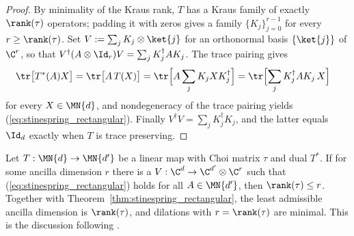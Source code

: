 \begin{proof}
    \leanok
    By minimality of the Kraus rank, $T$ has a Kraus family of exactly
    $\rank(\tau)$ operators; padding it with zeros gives a family
    $\{K_j\}_{j=0}^{r-1}$ for every $r\geq\rank(\tau)$. Set
    $V:=\sum_j K_j\otimes\ket{j}$ for an orthonormal basis $\{\ket{j}\}$ of
    $\C^{r}$, so that $V^\dagger(A\otimes\Id_r)V=\sum_j K_j^\dagger AK_j$. The
    trace pairing gives
    \begin{align}
        \tr\bigl[T^*(A)X\bigr]
        &=\tr\bigl[A\,T(X)\bigr]
          =\tr\Bigl[A\sum_j K_jXK_j^\dagger\Bigr]
          =\tr\Bigl[\sum_j K_j^\dagger AK_j\,X\Bigr]
        \label{eq:stinespring_rectangular_pairing}
    \end{align}
    for every $X\in\MN{d}$, and nondegeneracy of the trace pairing yields
    (\ref{eq:stinespring_rectangular}). Finally
    $V^\dagger V=\sum_j K_j^\dagger K_j$, and the latter equals $\Id_d$
    exactly when $T$ is trace preserving.
\end{proof}

\begin{lemma}\label{lem:stinespring_rectangular_least_dim}
    \leanok
    Let $T:\MN{d}\to\MN{d'}$ be a linear map with Choi matrix $\tau$ and dual
    $T^*$. If for some ancilla dimension $r$ there is a
    $V:\C^{d}\to\C^{d'}\otimes\C^{r}$ such that
    (\ref{eq:stinespring_rectangular}) holds for all $A\in\MN{d'}$, then
    $\rank(\tau)\le r$. Together with
    Theorem~\ref{thm:stinespring_rectangular}, the least admissible ancilla
    dimension is $\rank(\tau)$, and dilations with $r=\rank(\tau)$ are
    minimal. This is the discussion following
    \cite[Theorem~2.2]{Wolf2012Quantum}.
\end{lemma}

